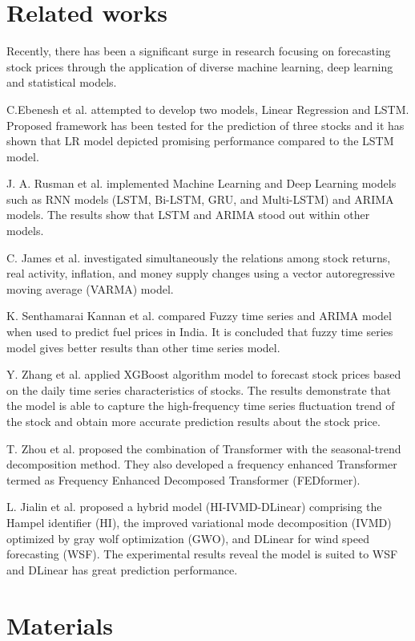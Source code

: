 \documentclass[conference]{IEEEtran}
\begin{document}
\section{Related works}
Recently, there has been a significant surge in research focusing on forecasting stock prices through the application of diverse machine learning, deep learning and statistical models. \par
C.Ebenesh et al. \cite{b1} attempted to develop two models, Linear Regression and LSTM. Proposed framework has been tested for the prediction of three stocks and it has shown that LR model depicted promising performance compared to the LSTM model.\par
J. A. Rusman et al. \cite{b2} implemented Machine Learning and Deep Learning models such as RNN models (LSTM, Bi-LSTM, GRU, and Multi-LSTM) and ARIMA models. The results show that LSTM and ARIMA stood out within other models.\par
C. James et al. \cite{b3} investigated simultaneously the relations among stock returns, real activity, inflation, and money supply changes using a vector autoregressive moving average (VARMA) model.\par
K. Senthamarai Kannan et al. \cite{b4} compared Fuzzy time series and ARIMA model when used to predict fuel prices in India. It is concluded that fuzzy time series model gives better results than other time series model.\par
Y. Zhang et al. \cite{b5} applied XGBoost algorithm model to forecast stock prices based on the daily time series characteristics of stocks. The results demonstrate that the model is able to capture the high-frequency time series fluctuation trend of the stock and obtain more accurate prediction results about the stock price.\par
T. Zhou et al. \cite{b6} proposed the combination of Transformer with the seasonal-trend decomposition method. They also developed a frequency enhanced Transformer termed as Frequency Enhanced Decomposed Transformer (FEDformer).\par
L. Jialin et al. \cite{b7} proposed a hybrid model (HI-IVMD-DLinear) comprising the Hampel identifier (HI), the improved variational mode decomposition (IVMD) optimized by gray wolf optimization (GWO), and DLinear for wind speed forecasting (WSF). The experimental results reveal the model is suited to WSF and DLinear has great prediction performance.

\section{Materials}
\end{document}
